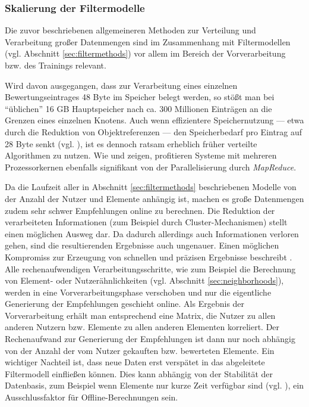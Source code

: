 \subsubsection{Skalierung der Filtermodelle}\label{sec:scalefiltering}

Die zuvor beschriebenen allgemeineren Methoden zur Verteilung und Verarbeitung großer Datenmengen sind im Zusammenhang mit Filtermodellen (vgl. Abschnitt \ref{sec:filtermethods}) vor allem im Bereich der Vorverarbeitung bzw. des Trainings relevant. 

Wird davon ausgegangen, dass zur Verarbeitung eines einzelnen Bewertungseintrages 48 Byte im Speicher belegt werden, so stößt man bei ``üblichen'' 16 GB Hauptspeicher nach ca. 300 Millionen Einträgen an die Grenzen eines einzelnen Knotens. Auch wenn effizientere Speichernutzung --- etwa durch die Reduktion von Objektreferenzen --- den Speicherbedarf pro Eintrag auf 28 Byte senkt (vgl. \citep{mia}), ist es dennoch ratsam erheblich früher verteilte Algorithmen zu nutzen. Wie \citep{mapred06} und \citep{jiang11} zeigen, profitieren Systeme mit mehreren Prozessorkernen ebenfalls signifikant von der Parallelisierung durch \textit{MapReduce}.

Da die Laufzeit aller in Abschnitt \ref{sec:filtermethods} beschriebenen Modelle von der Anzahl der Nutzer und Elemente anhängig ist, machen es große Datenmengen zudem sehr schwer Empfehlungen online zu berechnen. Die Reduktion der verarbeiteten Informationen (zum Beispiel durch Cluster-Mechanismen) stellt einen möglichen Ausweg dar. Da dadurch allerdings auch Informationen verloren gehen, sind die resultierenden Ergebnisse auch ungenauer. Einen möglichen Kompromiss zur Erzeugung von schnellen und präzisen Ergebnisse beschreibt \citep{linden03}. Alle rechenaufwendigen Verarbeitungsschritte, wie zum Beispiel die Berechnung von Element- oder Nutzerähnlichkeiten (vgl. Abschnitt \ref{sec:neighborhoods}), werden in eine Vorverarbeitungsphase verschoben und nur die eigentliche Generierung der Empfehlungen geschieht online. Als Ergebnis der Vorverarbeitung erhält man entsprechend eine Matrix, die Nutzer zu allen anderen Nutzern bzw. Elemente zu allen anderen Elementen korreliert. Der Rechenaufwand zur Generierung der Empfehlungen ist dann nur noch abhängig von der Anzahl der vom Nutzer gekauften bzw. bewerteten Elemente. Ein wichtiger Nachteil ist, dass neue Daten erst verspätet in das abgeleitete Filtermodell einfließen können. Dies kann abhängig von der Stabilität der Datenbasis, zum Beispiel wenn Elemente nur kurze Zeit verfügbar sind (vgl. \citep{Cornelis20074906}), ein Ausschlussfaktor für Offline-Berechnungen sein. \citep{linden03}


